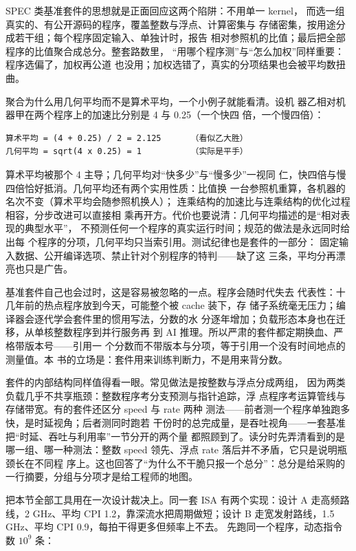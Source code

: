SPEC 类基准套件的思想就是正面回应这两个陷阱：不用单一 kernel，
而选一组真实的、有公开源码的程序，覆盖整数与浮点、计算密集与
存储密集，按用途分成若干组；每个程序固定输入、单独计时，报告
相对参照机的比值；最后把全部程序的比值聚合成总分。整套路数里，
“用哪个程序测”与“怎么加权”同样重要：程序选偏了，加权再公道
也没用；加权选错了，真实的分项结果也会被平均数扭曲。

聚合为什么用几何平均而不是算术平均，一个小例子就能看清。设机
器乙相对机器甲在两个程序上的加速比分别是 4 与 0.25（一个快四
倍，一个慢四倍）：

\begin{lstlisting}
算术平均 = (4 + 0.25) / 2 = 2.125      （看似乙大胜）
几何平均 = sqrt(4 x 0.25) = 1          （实际是平手）
\end{lstlisting}

算术平均被那个 4 主导；几何平均对“快多少”与“慢多少”一视同
仁，快四倍与慢四倍恰好抵消。几何平均还有两个实用性质：比值换
一台参照机重算，各机器的名次不变（算术平均会随参照机换人）；
连乘结构的加速比与连乘结构的优化过程相容，分步改进可以直接相
乘再开方。代价也要说清：几何平均描述的是“相对表现的典型水平”，
不预测任何一个程序的真实运行时间；规范的做法是永远同时给出每
个程序的分项，几何平均只当索引用。测试纪律也是套件的一部分：
固定输入数据、公开编译选项、禁止针对个别程序的特判——缺了这
三条，平均分再漂亮也只是广告。

基准套件自己也会过时，这是容易被忽略的一点。程序会随时代失去
代表性：十几年前的热点程序放到今天，可能整个被 cache 装下，存
储子系统毫无压力；编译器会逐代学会套件里的惯用写法，分数的水
分逐年增加；负载形态本身也在迁移，从单核整数程序到并行服务再
到 AI 推理。所以严肃的套件都定期换血、严格带版本号——引用一
个分数而不带版本与分项，等于引用一个没有时间地点的测量值。本
书的立场是：套件用来训练判断力，不是用来背分数。

套件的内部结构同样值得看一眼。常见做法是按整数与浮点分成两组，
因为两类负载几乎不共享瓶颈：整数程序考分支预测与指针追踪，浮
点程序考运算管线与存储带宽。有的套件还区分 speed 与 rate 两种
测法——前者测一个程序单独跑多快，是时延视角；后者测同时跑若
干份时的总完成量，是吞吐视角——一套基准把“时延、吞吐与利用率”一节分开的两个量
都照顾到了。读分时先弄清看到的是哪一组、哪一种测法：整数
speed 领先、浮点 rate 落后并不矛盾，它只是说明瓶颈长在不同程
序上。这也回答了“为什么不干脆只报一个总分”：总分是给采购的
一行摘要，分组与分项才是给工程师的地图。

把本节全部工具用在一次设计裁决上。同一套 ISA 有两个实现：设计
A 走高频路线，2 GHz、平均 CPI 1.2，靠深流水把周期做短；设计 B
走宽发射路线，1.5 GHz、平均 CPI 0.9，每拍干得更多但频率上不去。
先跑同一个程序，动态指令数 $10^9$ 条：

